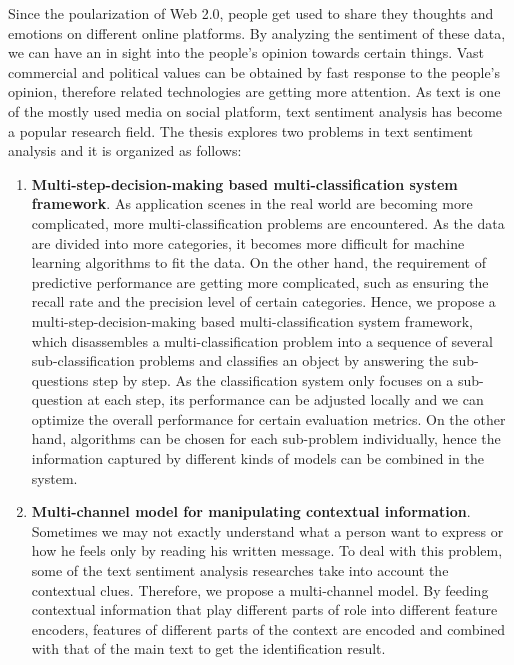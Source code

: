 \begin{eabstract}

Since the poularization of Web 2.0, people get used to share they thoughts and emotions on different online platforms. By analyzing the sentiment of these data, we can have an in sight into the people's opinion towards certain things. Vast commercial and political values can be obtained by fast response to the people's opinion, therefore related technologies are getting more attention. As text is one of the mostly used media on social platform, text sentiment analysis has become a popular research field. The thesis explores two problems in text sentiment analysis and it is organized as follows:

\begin{enumerate}

\item {\bf Multi-step-decision-making based multi-classification system framework}. As application scenes in the real world are becoming more complicated, more multi-classification problems are encountered. As the data are divided into more categories, it becomes more difficult for machine learning algorithms to fit the data. On the other hand, the requirement of predictive performance are getting more complicated, such as ensuring the recall rate and the precision level of certain categories. Hence, we propose a multi-step-decision-making based multi-classification system framework, which disassembles a multi-classification problem into a sequence of several sub-classification problems and classifies an object by answering the sub-questions step by step. As the classification system only focuses on a sub-question at each step, its performance can be adjusted locally and we can optimize the overall performance for certain evaluation metrics. On the other hand, algorithms can be chosen for each sub-problem individually, hence the information captured by different kinds of models can be combined in the system. 

\item {\bf Multi-channel model for manipulating contextual information}. Sometimes we may not exactly understand what a person want to express or how he feels only by reading his written message. To deal with this problem, some of the text sentiment analysis researches take into account the contextual clues. Therefore, we propose a multi-channel model. By feeding contextual information that play different parts of role into different feature encoders, features of different parts of the context are encoded and combined with that of the main text to get the identification result.


\end{enumerate}
\end{eabstract}
